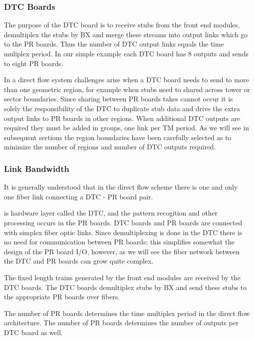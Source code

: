 \documentclass[letterpaper]{article}
\begin{document}
\subsubsection{DTC Boards}

The purpose of the DTC board is to receive stubs from the front end modules, demultiplex the stubs by BX and merge these streams into output links which go to the PR boards.  Thus the number of DTC output links equals the time muliplex period.  In our simple example each DTC board has 8 outputs and sends to eight PR boards.

In a direct flow system challenges arise when a DTC board needs to send to more than one geometric region, for example when stubs need to shared across tower or sector boundaries.  Since sharing between PR boards takes cannot occur it is solely the responsibility of the DTC to duplicate stub data and drive the extra output links to PR boards in other regions.  When additional DTC outputs are required they must be added in groups, one link per TM period.  As we will see in subsequent sections the region boundaries have been carefully selected as to minimize the number of regions and number of DTC outputs required.

\subsubsection{Link Bandwidth}

It is generally understood that in the direct flow scheme there is one and only one fiber link connecting a DTC - PR board pair.









is hardware layer called the DTC, and the pattern recogition and other processing occurs in the PR boards.  DTC boards and PR boards are connected with simplex fiber optic links.  Since demultiplexing is done in the DTC there is no need for communication between PR boards; this simplifies somewhat the design of the PR board I/O, however, as we will see the fiber network between the DTC and PR boards can grow quite complex.


The fixed length trains generated by the front end modules are received by the DTC boards.  The DTC boards demultiplex stubs by BX and send these stubs to the appropriate PR boards over fibers.  

The number of PR boards determines the time multiplex period in the direct flow architecture.  The number of PR boards determines the number of outputs per DTC board as well.  
\end{document}
